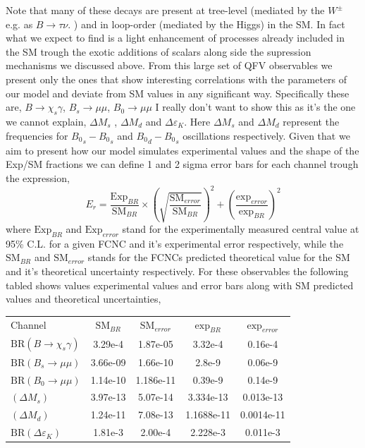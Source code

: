 Note that many of these decays are present at tree-level (mediated by the $W^\pm$ e.g. as $B \rightarrow \tau \nu$. ) and in loop-order (mediated by the Higgs) in the SM. 
% 
In fact what we expect to find is a light enhancement of processes already included in the SM trough the exotic additions of scalars along side the supression mechanisms we discussed above. 
%
From this large set of QFV observables we present only the ones that show interesting correlations with the parameters of our model and deviate from SM values in any significant way.
%
Specifically these are, $B \rightarrow \chi_s \gamma$, $B_s \rightarrow \mu \mu$, { \color{red} $B_0 \rightarrow  \mu \mu$ I really don't want to show this as it's the one we cannot explain}, $\Delta M_s$ , $\Delta M_d$ and $\Delta \varepsilon_K$. 
%
Here $\Delta M_s$ and $\Delta M_d$ represent the frequencies for ${B_0}_s - {B_0}_s$ and ${B_0}_d - {B_0}_s$ oscillations respectively. 
% 
Given that we aim to present how our model simulates experimental values and the shape of the Exp/SM  fractions we can define 1 and 2 sigma error bars for each channel trough the expression, 
%
%
\begin{equation}
E_r = \frac{\text{Exp}_{BR}}{\text{SM}_{BR}} \times \left( \sqrt{\frac{\text{SM}_{error}}{\text{SM}_{BR}}}\right)^2 + \left( \frac{\text{exp}_{error}}{\text{exp}_{BR}} \right)^2
\end{equation} 
%
where $\text{Exp}_{BR}$ and $\text{Exp}_{error}$ stand for the experimentally measured central value at 95\% C.L. for a given FCNC and it's experimental error respectively, while the $\text{SM}_{BR}$ and $\text{SM}_{error}$ stands for the FCNCs predicted theoretical value for the SM and it's theoretical uncertainty respectively. 
% 
For these observables the following tabled shows values experimental values and error bars along with SM predicted values and theoretical uncertainties, 
%
\begin{table}[H]
\centering
\begin{tabular}{l|cccc}
 Channel & $\text{SM}_{BR}$         & $\text{SM}_{error}$ & $\text{exp}_{BR}$ & $\text{exp}_{error}$   \\ \cline{2-5} 
$\text{BR}( B \rightarrow \chi_s \gamma )$ & 3.29e-4 & 1.87e-05 & 3.32e-4 & 0.16e-4 \\
$\text{BR}( B_s \rightarrow \mu \mu ) $ & 3.66e-09 & 1.66e-10 & 2.8e-9 & 0.06e-9       \\
$\text{BR}(B_0 \rightarrow  \mu \mu )$ & 1.14e-10 & 1.186e-11 & 0.39e-9    & 0.14e-9       \\
$( \Delta M_s )$ & 3.97e-13 & 5.07e-14 & 3.334e-13  &  0.013e-13  \\
$( \Delta M_d )$ & 1.24e-11 & 7.08e-13 & 1.1688e-11 &  0.0014e-11  \\
$\text{BR}(\Delta \varepsilon_K )$ & 1.81e-3  & 2.00e-4 & 2.228e-3  & 0.011e-3     
\end{tabular}
\end{table}

